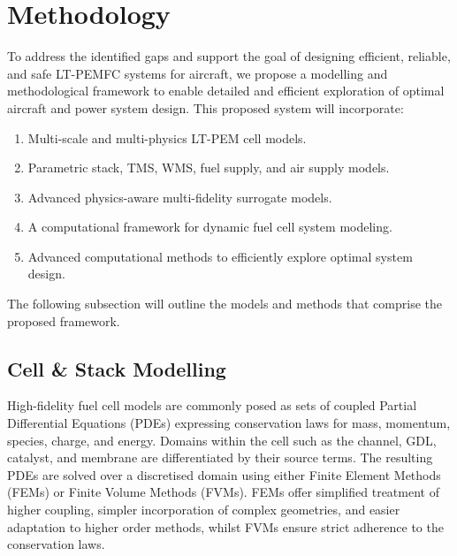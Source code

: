\section{Methodology} \label{sec:method}

To address the identified gaps and support the goal of designing efficient, reliable, and safe LT-PEMFC systems for aircraft, we propose a modelling and methodological framework to enable detailed and efficient exploration of optimal aircraft and power system design. This proposed system will incorporate:
\begin{enumerate}
	\item Multi-scale and multi-physics LT-PEM cell models.
	\item Parametric stack, TMS, WMS, fuel supply, and air supply models.
	\item Advanced physics-aware multi-fidelity surrogate models.
	\item A computational framework for dynamic fuel cell system modeling.
	\item Advanced computational methods to efficiently explore optimal system design.
\end{enumerate}
The following subsection will outline the models and methods that comprise the proposed framework.

\subsection{Cell \& Stack Modelling}
High-fidelity fuel cell models are commonly posed as sets of coupled Partial Differential Equations (PDEs) expressing conservation laws for mass, momentum, species, charge, and energy.
Domains within the cell such as the channel, GDL, catalyst, and membrane are differentiated by their source terms. The resulting PDEs are solved over a discretised domain using either Finite Element Methods (FEMs) or Finite Volume Methods (FVMs).
FEMs offer simplified treatment of higher coupling, simpler incorporation of complex geometries, and easier adaptation to higher order methods, whilst FVMs ensure strict adherence to the conservation laws.

